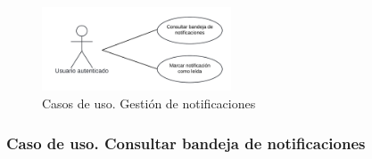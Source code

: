 \begin{figure}[H]
    \centering
    \includegraphics[width=0.5\textwidth]{figures/6-Analisis/6-Casos-uso/6_3_6_Gestion-notificaciones.png}
    \caption{Casos de uso. Gestión de notificaciones}
    \label{fig:cu_gestion-notificaciones}
\end{figure}

\subsubsection{Caso de uso. Consultar bandeja de notificaciones} \label{sec:cu_notificaciones}

